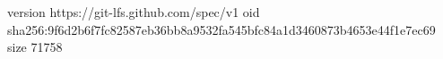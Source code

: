 version https://git-lfs.github.com/spec/v1
oid sha256:9f6d2b6f7fc82587eb36bb8a9532fa545bfc84a1d3460873b4653e44f1e7ec69
size 71758
